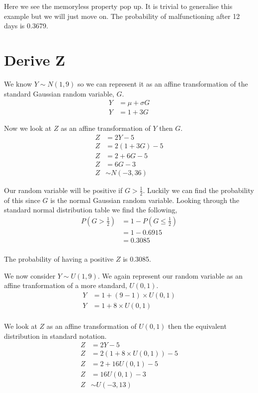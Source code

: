 \documentclass{article}
\begin{document}
Here we see the memoryless property pop up. It is trivial to
generalise this example but we will just move on. The probability of
malfunctioning after 12 days is 0.3679.

\section{Derive Z}
We know $Y \sim N(1,9)$ so we can represent it as an affine transformation
of the standard Gaussian random variable, $G$.
\begin{align*}
    Y &= \mu + \sigma G \\
    Y &= 1 + 3G
\end{align*}

Now we look at $Z$ as an affine transformation of $Y$ then $G$.
\begin{align*}
    Z &= 2Y - 5 \\
    Z &= 2(1 + 3G) - 5 \\
    Z &= 2 + 6G - 5 \\
    Z &= 6G - 3 \\
    Z &\sim N(-3, 36)
\end{align*}

Our random variable will be positive if $G > \frac{1}{2}$. Luckily we can
find the probability of this since $G$ is the normal Gaussian random variable.
Looking through the standard normal distribution table we find the following,
\begin{align*}
    P(G > \frac{1}{2}) &= 1 - P(G \leq \frac{1}{2}) \\
    &= 1 - 0.6915 \\
    &= 0.3085 \\
\end{align*}

The probability of having a positive $Z$ is 0.3085.

We now consider $Y \sim U(1,9)$. We again represent our random variable as
an affine tranformation of a more standard, $U(0,1)$.
\begin{align*}
    Y &= 1 + (9-1)\times U(0,1) \\
    Y &= 1 + 8\times U(0,1) \\
\end{align*}

We look at $Z$ as an affine transformation of $U(0,1)$ then the
equivalent distribution in standard notation.
\begin{align*}
    Z &= 2Y - 5 \\
    Z &= 2(1 + 8\times U(0,1)) - 5 \\
    Z &= 2 + 16U(0,1) - 5 \\
    Z &= 16U(0,1) - 3 \\
    Z &\sim U(-3, 13) \\
\end{align*}
\end{document}
